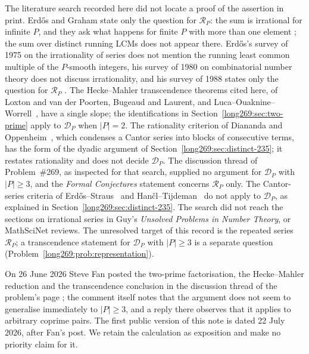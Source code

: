 The literature search recorded here did not locate a proof of the
assertion in print. Erd\H{o}s and Graham state only the question for $\mathcal R_P$: the sum is irrational
for infinite $P$, and they ask what happens for finite $P$ with more than
one element \cite[p.~65]{erdosgraham1980}; the sum over distinct running LCMs does not
appear there.  Erd\H{o}s's survey of
1975 on the irrationality of series \cite{erdos1975} does not mention the
running least common multiple of the $P$-smooth integers, his survey of
1980 on combinatorial number theory \cite{erdos1980survey} does not discuss
irrationality, and his survey of
1988 states only the question for $\mathcal R_P$ \cite[p.~106]{erdos1988}.
The Hecke--Mahler transcendence theorems cited here, of Loxton and
van der Poorten, Bugeaud and Laurent, and
Luca--Ouaknine--Worrell~\cite{lucaouaknineworrell2025}, have a single
slope; the identifications in Section~\ref{long269:sec:two-prime}
apply to $\mathcal D_P$ when $|P|=2$.  The rationality
criterion of Diananda and Oppenheim~\cite{dianandaoppenheim1955}, which
condenses a Cantor series into blocks of consecutive terms, has the form of
the dyadic argument of Section~\ref{long269:sec:distinct-235}; it restates
rationality and does not decide $\mathcal D_P$.
The discussion thread of Problem~\#269, as inspected for that search,
supplied no argument for $\mathcal D_P$ with $|P|\ge3$, and the
\emph{Formal Conjectures} statement
\cite{formalconjectures269} concerns $\mathcal R_P$ only.  The Cantor-series
criteria of Erd\H{o}s--Straus~\cite[Theorem~2.1]{erdosstraus1974} and
Han\v{c}l--Tijdeman~\cite[Theorem~3.1]{hancltijdeman2004} do not apply to
$\mathcal D_P$, as explained in Section~\ref{long269:sec:distinct-235}.  The
search did not reach the sections on irrational series in Guy's
\emph{Unsolved Problems in Number Theory}, or MathSciNet reviews.  The unresolved target of this record is the
repeated series $\mathcal R_P$; a transcendence statement for $\mathcal D_P$
with $|P|\ge3$ is a separate question
(Problem~\ref{long269:prob:representation}).

On 26 June 2026 Steve Fan posted the two-prime factorisation, the Hecke--Mahler reduction and the transcendence
conclusion in the discussion thread of the problem's page
\cite{fan2026comment}; the comment itself notes that the argument does not seem
to generalise immediately to $|P|\ge3$, and a reply there observes that it
applies to arbitrary coprime pairs.  The first public version of this
note is dated 22 July 2026, after Fan's post.  We retain
the calculation as exposition and make no priority claim for it.

